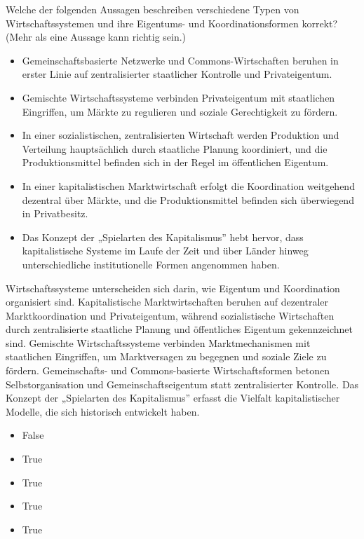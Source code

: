 \documentclass[
  nswissgerman,
  a4paper,
  DIV=11,
  numbers=noendperiod,
  oneside,
  openany]{scrreprt}
\providecommand{\tightlist}{%
  \setlength{\itemsep}{0pt}\setlength{\parskip}{0pt}}
\begin{document}
Welche der folgenden Aussagen beschreiben verschiedene Typen von
Wirtschaftssystemen und ihre Eigentums- und Koordinationsformen korrekt?
(Mehr als eine Aussage kann richtig sein.)

\begin{itemize}
\tightlist
\item[$\square$]
  Gemeinschaftsbasierte Netzwerke und Commons-Wirtschaften beruhen in
  erster Linie auf zentralisierter staatlicher Kontrolle und
  Privateigentum.
\item[$\square$]
  Gemischte Wirtschaftssysteme verbinden Privateigentum mit staatlichen
  Eingriffen, um Märkte zu regulieren und soziale Gerechtigkeit zu
  fördern.
\item[$\square$]
  In einer sozialistischen, zentralisierten Wirtschaft werden Produktion
  und Verteilung hauptsächlich durch staatliche Planung koordiniert, und
  die Produktionsmittel befinden sich in der Regel im öffentlichen
  Eigentum.
\item[$\square$]
  In einer kapitalistischen Marktwirtschaft erfolgt die Koordination
  weitgehend dezentral über Märkte, und die Produktionsmittel befinden
  sich überwiegend in Privatbesitz.
\item[$\square$]
  Das Konzept der „Spielarten des Kapitalismus'' hebt hervor, dass
  kapitalistische Systeme im Laufe der Zeit und über Länder hinweg
  unterschiedliche institutionelle Formen angenommen haben.
\end{itemize}

Wirtschaftssysteme unterscheiden sich darin, wie Eigentum und
Koordination organisiert sind. Kapitalistische Marktwirtschaften beruhen
auf dezentraler Marktkoordination und Privateigentum, während
sozialistische Wirtschaften durch zentralisierte staatliche Planung und
öffentliches Eigentum gekennzeichnet sind. Gemischte Wirtschaftssysteme
verbinden Marktmechanismen mit staatlichen Eingriffen, um Marktversagen
zu begegnen und soziale Ziele zu fördern. Gemeinschafts- und
Commons-basierte Wirtschaftsformen betonen Selbstorganisation und
Gemeinschaftseigentum statt zentralisierter Kontrolle. Das Konzept der
„Spielarten des Kapitalismus'' erfasst die Vielfalt kapitalistischer
Modelle, die sich historisch entwickelt haben.

\begin{itemize}
\tightlist
\item
  False
\item
  True
\item
  True
\item
  True
\item
  True
\end{itemize}
\end{document}
